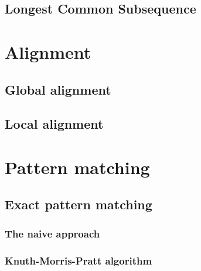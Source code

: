 \documentclass[12pt, letterpaper]{article}
\begin{document}
\subsection{Longest Common Subsequence}


\section{Alignment}

\subsection{Global alignment}

\subsection{Local alignment}

\section{Pattern matching}

\subsection{Exact pattern matching}

\subsubsection{The naive approach}

\subsubsection{Knuth-Morris-Pratt algorithm}
\end{document}
